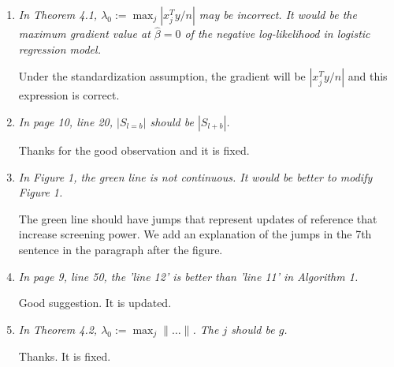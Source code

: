 \documentclass{article}
\begin{document}
\begin{enumerate}

\item \emph{In Theorem 4.1, $\lambda_0 := \max_j |x^T_j y/n|$ may be incorrect. It would be the maximum gradient value at $\hat{\beta} = 0$ of the negative log-likelihood in logistic regression model.}
    
    Under the standardization assumption, the gradient will be $|x^T_j y/n|$ and this expression is correct.

\item \emph{In page 10, line 20, $|S_{l=b}|$ should be $|S_{l+b}|$.}

    Thanks for the good observation and it is fixed.

\item \emph{In Figure 1, the green line is not continuous. It would be better to modify Figure 1.}
    
    The green line should have jumps that represent updates of reference that increase screening power. We add an explanation of the jumps in the 7th sentence in the paragraph after the figure.

\item \emph{In page 9, line 50, the ’line 12’ is better than ’line 11’ in Algorithm 1.}

    Good suggestion. It is updated.

\item \emph{In Theorem 4.2, $\lambda_0 := \max_j \lVert \ldots \rVert$. The $j$ should be $g$.}

    Thanks. It is fixed.
  
\end{enumerate}
\end{document}
